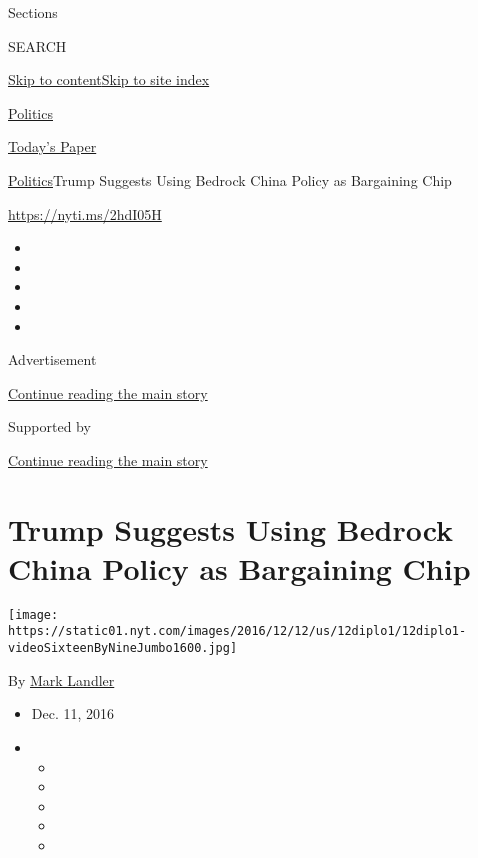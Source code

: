 Sections

SEARCH

\protect\hyperlink{site-content}{Skip to
content}\protect\hyperlink{site-index}{Skip to site index}

\href{https://www.nytimes.com/section/politics}{Politics}

\href{https://myaccount.nytimes.com/auth/login?response_type=cookie\&client_id=vi}{}

\href{https://www.nytimes.com/section/todayspaper}{Today's Paper}

\href{/section/politics}{Politics}\textbar{}Trump Suggests Using Bedrock
China Policy as Bargaining Chip

\url{https://nyti.ms/2hdI05H}

\begin{itemize}
\item
\item
\item
\item
\item
\end{itemize}

Advertisement

\protect\hyperlink{after-top}{Continue reading the main story}

Supported by

\protect\hyperlink{after-sponsor}{Continue reading the main story}

\hypertarget{trump-suggests-using-bedrock-china-policy-as-bargaining-chip}{%
\section{Trump Suggests Using Bedrock China Policy as Bargaining
Chip}\label{trump-suggests-using-bedrock-china-policy-as-bargaining-chip}}

\texttt{[image: https://static01.nyt.com/images/2016/12/12/us/12diplo1/12diplo1-videoSixteenByNineJumbo1600.jpg]}

By \href{http://www.nytimes.com/by/mark-landler}{Mark Landler}

\begin{itemize}
\item
  Dec. 11, 2016
\item
  \begin{itemize}
  \item
  \item
  \item
  \item
  \item
  \end{itemize}
\end{itemize}

